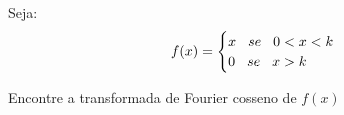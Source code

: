 \linespread{1.5}
Seja:
\begin{equation*}
    f(x) = \begin{cases}
    x \hspace{0.3cm} se \hspace{0.3cm} 0 < x < k\\
    0 \hspace{0.3cm} se \hspace{0.3cm} x > k
    \end{cases}
\end{equation*}

Encontre a transformada de Fourier cosseno de $f(x)$